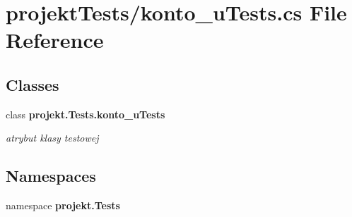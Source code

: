 \section{projekt\+Tests/konto\+\_\+u\+Tests.cs File Reference}
\label{konto__uTests_8cs}
\subsection*{Classes}
\begin{DoxyCompactItemize}
\item 
class \textbf{ projekt.\+Tests.\+konto\+\_\+u\+Tests}
\begin{DoxyCompactList}\small\item\em atrybut klasy testowej \end{DoxyCompactList}\end{DoxyCompactItemize}
\subsection*{Namespaces}
\begin{DoxyCompactItemize}
\item 
namespace \textbf{ projekt.\+Tests}
\end{DoxyCompactItemize}
